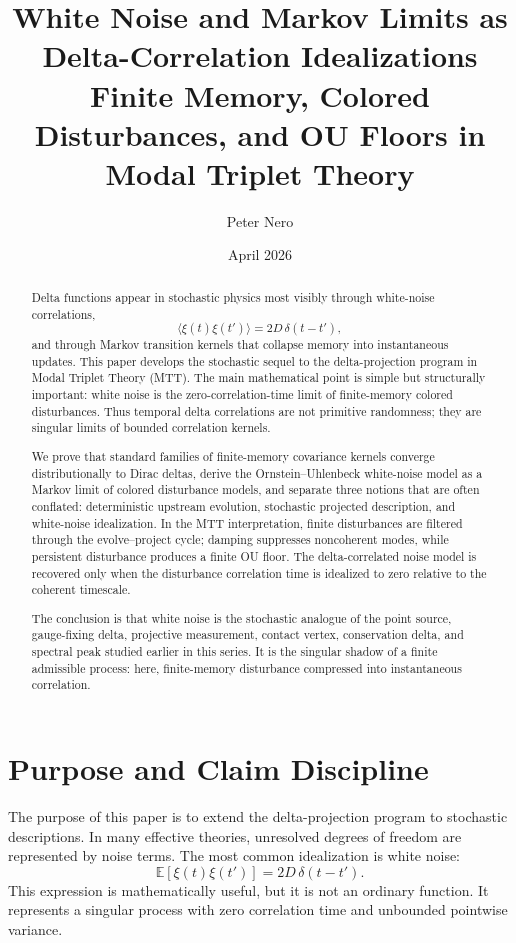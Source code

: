 \documentclass[11pt]{article}
\title{White Noise and Markov Limits as Delta-Correlation Idealizations\\
\large Finite Memory, Colored Disturbances, and OU Floors in Modal Triplet Theory}
\author{Peter Nero}
\date{April 2026}
\begin{document}
\maketitle

\begin{abstract}
Delta functions appear in stochastic physics most visibly through white-noise correlations,
\[
\langle \xi(t)\xi(t')\rangle = 2D\,\delta(t-t'),
\]
and through Markov transition kernels that collapse memory into instantaneous updates. This paper develops the stochastic sequel to the delta-projection program in Modal Triplet Theory (MTT). The main mathematical point is simple but structurally important: white noise is the zero-correlation-time limit of finite-memory colored disturbances. Thus temporal delta correlations are not primitive randomness; they are singular limits of bounded correlation kernels.

We prove that standard families of finite-memory covariance kernels converge distributionally to Dirac deltas, derive the Ornstein--Uhlenbeck white-noise model as a Markov limit of colored disturbance models, and separate three notions that are often conflated: deterministic upstream evolution, stochastic projected description, and white-noise idealization. In the MTT interpretation, finite disturbances are filtered through the evolve--project cycle; damping suppresses noncoherent modes, while persistent disturbance produces a finite OU floor. The delta-correlated noise model is recovered only when the disturbance correlation time is idealized to zero relative to the coherent timescale.

The conclusion is that white noise is the stochastic analogue of the point source, gauge-fixing delta, projective measurement, contact vertex, conservation delta, and spectral peak studied earlier in this series. It is the singular shadow of a finite admissible process: here, finite-memory disturbance compressed into instantaneous correlation.
\end{abstract}

\tableofcontents

\section{Purpose and Claim Discipline}

The purpose of this paper is to extend the delta-projection program to stochastic descriptions. In many effective theories, unresolved degrees of freedom are represented by noise terms. The most common idealization is white noise:
\[
\mathbb E[\xi(t)\xi(t')] = 2D\,\delta(t-t').
\]
This expression is mathematically useful, but it is not an ordinary function. It represents a singular process with zero correlation time and unbounded pointwise variance.
\end{document}
